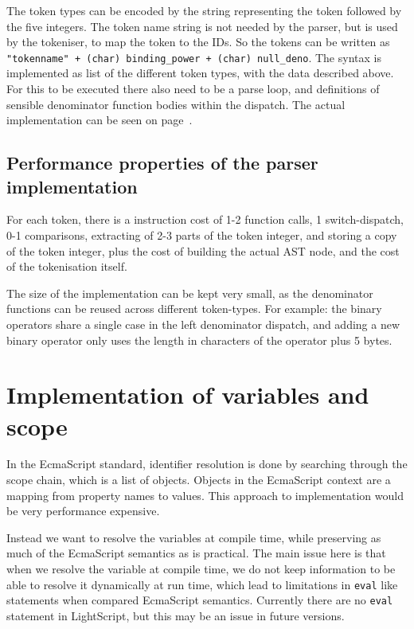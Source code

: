 \documentclass[11pt]{report}
\begin{document}
The token types can be encoded by the string representing the token followed by the five integers.
The token name string is not needed by the parser, but is used by the tokeniser, to map the token to the IDs.
So the tokens can be written as {\tt "tokenname" + (char) binding\_power + 
(char) null\_deno}. 
The syntax is implemented as list of the different token types, with the data described above.
For this to be executed there also need to be a parse loop, and definitions of sensible denominator function bodies within the dispatch.
The actual implementation can be seen on page~\pageref{code-lightscript-parser}.


\subsection{Performance properties of the parser implementation}

For each token, there is a instruction cost of 1-2 function calls, 1 switch-dispatch, 0-1 comparisons, extracting of 2-3 parts of the token integer, and storing a copy of the token integer, plus the cost of building the actual AST node, and the cost of the tokenisation itself.

The size of the implementation can be kept very small, as the denominator functions can be reused across different token-types. For example: the binary operators share a single case in the left denominator dispatch, and adding a new binary operator only uses the length in characters of the operator plus 5 bytes. 

\section{Implementation of variables and scope}
In the EcmaScript standard, identifier resolution is done by searching through the scope chain, which is a list of objects. Objects in the EcmaScript context are a mapping from property names to values. This approach to implementation would be very performance expensive.

Instead we want to resolve the variables at compile time, while preserving as much of the EcmaScript semantics as is practical. The main issue here is that when we resolve the variable at compile time, we do not keep information to be able to resolve it dynamically at run time,
which lead to limitations in \verb|eval| like statements when compared EcmaScript semantics. Currently there are no \verb|eval| statement in LightScript, but this may be an issue in future versions.
\end{document}
